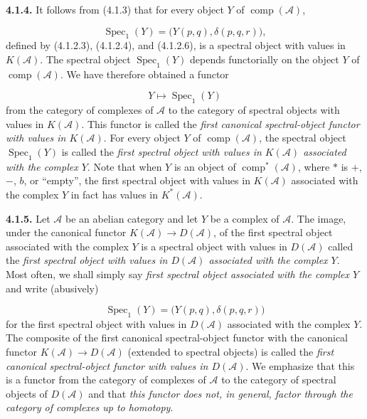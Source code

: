 \clearpage
{}%
\begingroup\small\setlength{\parskip}{0pt}\setlength{\emergencystretch}{1.5em}
\setlength{\abovedisplayskip}{4pt plus 2pt minus 2pt}%
\setlength{\belowdisplayskip}{4pt plus 2pt minus 2pt}%

\medskip\noindent\textbf{4.1.4.}\quad
It follows from (4.1.3) that for every object $Y$ of
$\operatorname{comp}(\mathcal A)$,

\[
\operatorname{Spec}_1(Y)=\bigl(Y(p,q),\delta(p,q,r)\bigr),
\]
defined by (4.1.2.3), (4.1.2.4), and (4.1.2.6), is a spectral object with
values in $K(\mathcal A)$. The spectral object $\operatorname{Spec}_1(Y)$
depends functorially on the object $Y$ of
$\operatorname{comp}(\mathcal A)$. We have therefore obtained a functor

\[
Y\longmapsto\operatorname{Spec}_1(Y)
\]
from the category of complexes of $\mathcal A$ to the category of spectral
objects with values in $K(\mathcal A)$. This functor is called the
\emph{first canonical spectral-object functor with values in
$K(\mathcal A)$}. For every object $Y$ of
$\operatorname{comp}(\mathcal A)$, the spectral object
$\operatorname{Spec}_1(Y)$ is called the \emph{first spectral object with
values in $K(\mathcal A)$ associated with the complex $Y$}. Note that when
$Y$ is an object of $\operatorname{comp}^{*}(\mathcal A)$, where $*$ is
$+$, $-$, $b$, or ``empty'', the first spectral object with values in
$K(\mathcal A)$ associated with the complex $Y$ in fact has values in
$K^{*}(\mathcal A)$.

\medskip\noindent\textbf{4.1.5.}\quad
Let $\mathcal A$ be an abelian category and let $Y$ be a complex of
$\mathcal A$. The image, under the canonical functor
$K(\mathcal A)\longrightarrow D(\mathcal A)$, of the first spectral object
associated with the complex $Y$ is a spectral object with values in
$D(\mathcal A)$ called the \emph{first spectral object with values in
$D(\mathcal A)$ associated with the complex $Y$}. Most often, we shall
simply say \emph{first spectral object associated with the complex $Y$} and
write (abusively)

\[
\operatorname{Spec}_1(Y)=\bigl(Y(p,q),\delta(p,q,r)\bigr)
\]
for the first spectral object with values in $D(\mathcal A)$ associated
with the complex $Y$. The composite of the first canonical spectral-object
functor with the canonical functor
$K(\mathcal A)\longrightarrow D(\mathcal A)$ (extended to spectral objects)
is called the \emph{first canonical spectral-object functor with values in
$D(\mathcal A)$}. We emphasize that this is a functor from the category of
complexes of $\mathcal A$ to the category of spectral objects of
$D(\mathcal A)$ and that \emph{this functor does not, in general, factor
through the category of complexes up to homotopy}.

